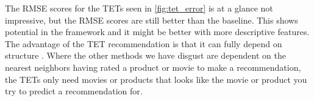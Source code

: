The RMSE scores for the TETs seen in \autoref{fig:tet_error} is at a glance not impressive, but the RMSE scores are still better than the baseline. 
This shows potential in the framework and it might be better with more descriptive features. The advantage of the TET recommendation is that it can fully depend on structure . 
Where the other methods we have disgust are dependent on the nearest neighbors having rated a product or movie to make a recommendation, the TETs only need movies or products that looks like the movie or product you try to predict a recommendation for.
